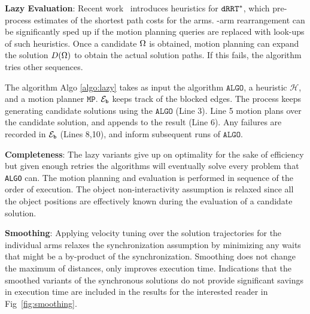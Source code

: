 
\noindent\textbf{Lazy Evaluation}: Recent work~\cite{shome2017improving} introduces heuristics for $ {\tt dRRT^*} $, which pre-process estimates of the shortest path costs for the arms. \Dual-arm rearrangement can be significantly sped up if the motion planning queries are replaced with look-ups of such heuristics. Once a candidate $ {{\Omega}} $ is obtained, motion planning can expand the solution $ {D}({{\Omega}}) $ to obtain the actual solution paths. If this fails, the algorithm tries other sequences. 


The algorithm Algo \ref{algo:lazy} takes as input the algorithm $ \mathtt{ALGO} $, a heuristic $ \mathcal{H} $, and a motion planner $ \mathtt{MP} $. $ \mathcal{E}_{\mathtt{b}}$ keeps track of the blocked edges. The process keeps generating candidate solutions using the $ \mathtt{ALGO} $ (Line 3). Line 5 motion plans over the candidate solution, and appends to the result (Line 6). Any failures are recorded in  $ \mathcal{E}_{\mathtt{b}}$ (Lines 8,10), and inform subsequent runs of $ \mathtt{ALGO} $.


\noindent\textbf{Completeness}: 
The lazy variants give up on optimality for the sake of efficiency but given enough retries the algorithms will eventually solve every problem that {\tt ALGO} can. The motion planning and evaluation is performed in sequence of the order of execution. The object non-interactivity assumption is relaxed since all the object positions are effectively known during the evaluation of a candidate solution.

\noindent\textbf{Smoothing}: 
Applying velocity tuning over the solution trajectories for the individual arms relaxes the synchronization assumption
by minimizing any waits that might be a by-product of the synchronization. 
Smoothing does not change the maximum of distances, only improves execution time. Indications that the smoothed variants of the synchronous solutions do not provide significant savings in execution time are included in the results for the interested reader in Fig~\ref{fig:smoothing}.

